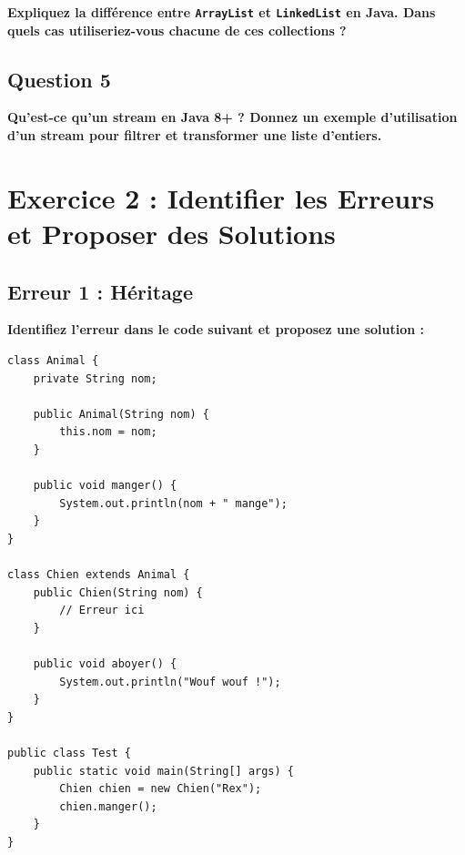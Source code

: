 \documentclass[11pt,a4paper]{article}
\begin{document}
\textbf{Expliquez la différence entre \texttt{ArrayList} et \texttt{LinkedList} en Java. Dans quels cas utiliseriez-vous chacune de ces collections ?}

\begin{reponsebox}
\vspace{4cm}
\end{reponsebox}

\subsection{Question 5}

\textbf{Qu'est-ce qu'un stream en Java 8+ ? Donnez un exemple d'utilisation d'un stream pour filtrer et transformer une liste d'entiers.}

\begin{reponsebox}
\vspace{4cm}
\end{reponsebox}

\newpage

\section{Exercice 2 : Identifier les Erreurs et Proposer des Solutions}

\subsection{Erreur 1 : Héritage}

\textbf{Identifiez l'erreur dans le code suivant et proposez une solution :}

\begin{lstlisting}
class Animal {
    private String nom;
    
    public Animal(String nom) {
        this.nom = nom;
    }
    
    public void manger() {
        System.out.println(nom + " mange");
    }
}

class Chien extends Animal {
    public Chien(String nom) {
        // Erreur ici
    }
    
    public void aboyer() {
        System.out.println("Wouf wouf !");
    }
}

public class Test {
    public static void main(String[] args) {
        Chien chien = new Chien("Rex");
        chien.manger();
    }
}
\end{lstlisting}

\begin{reponsebox}
\vspace{5cm}
\end{reponsebox}
\end{document}
